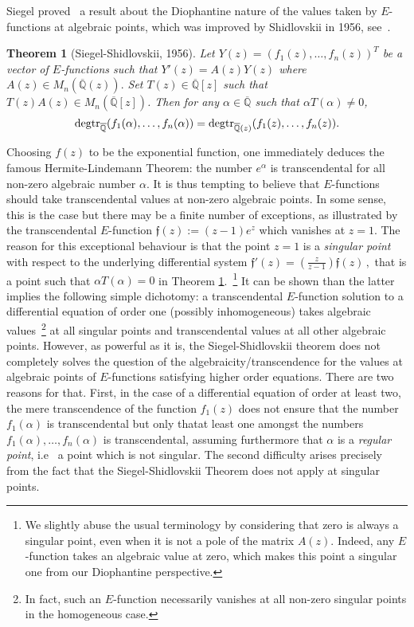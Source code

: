 \documentclass[reqno,english,12pt,a4paper]{smfart}
\newtheorem{thm}{Theorem}
\numberwithin{equation}{section}
\def\Qbar{\overline{\mathbb Q}}
\begin{document}
Siegel proved~\cite{Siegel} a result about the Diophantine nature of the values taken by $E$-functions at algebraic points, 
which was improved by Shidlovskii in 1956, see~\cite{shid}.

\begin{thm}[Siegel-Shidlovskii, 1956]\label{thmss}
Let $Y(z)=(f_1(z), \ldots, f_n(z))^T$ be a vector of $E$-functions such that 
$Y'(z)=A(z)Y(z)$ where $A(z)\in M_n(\Qbar(z)).$
Set $T(z)\in \Qbar[z]$ such that $T(z)A(z)\in M_n(\Qbar[z])$. 
Then for any $\alpha\in \Qbar$ such that $\alpha T(\alpha)\neq 0$, 
$$
\textup{degtr}_{\Qbar}(f_1(\alpha), \ldots, f_{n}(\alpha)) =\textup{degtr}_{\Qbar(z)}(f_1(z), \ldots, f_{n}(z)).
$$
\end{thm}


\medskip

Choosing $f(z)$ to be the exponential function, one  immediately deduces the famous Hermite-Lindemann Theorem:  
the number $e^{\alpha}$ is transcendental for all non-zero algebraic number $\alpha$. 
It is thus tempting to believe that $E$-functions should take transcendental values at non-zero algebraic points. In some sense, this is the case 
but there may be a finite number of exceptions, as illustrated by the transcendental $E$-function $\mathfrak f(z):=(z-1)e^z$ 
which vanishes at $z=1$. The reason for this exceptional behaviour is that the point $z=1$ is a \emph{singular point} with respect to the underlying 
differential system
$
\mathfrak f'(z)=(\frac{z}{z-1})\mathfrak f(z)\,,
$
that is a point such that $\alpha T(\alpha)=0$ in Theorem \ref{thmss}.~\footnote{We slightly abuse the usual terminology by considering 
that zero is always a singular point, even when it is not a pole of the matrix $A(z)$. Indeed,  
any $E$-function takes an algebraic value at zero, which makes this point a singular one from our Diophantine perspective.}  It can be shown than the latter implies 
the following simple dichotomy:  a transcendental  $E$-function solution to a differential equation 
of order one (possibly inhomogeneous) takes algebraic values~\footnote{In fact, such an $E$-function necessarily vanishes at all non-zero singular points in the homogeneous case.} 
at all singular points and transcendental values at all other algebraic points. 
However, as powerful as it is, the Siegel-Shidlovskii theorem does not completely solves the question of the 
algebraicity/transcendence for the values at algebraic points of $E$-functions satisfying higher order equations.  
There are two reasons for that. First, in the case of a differential equation of order at least two,  
 the mere transcendence of the function $f_1(z)$ does not ensure that 
the number $f_1(\alpha)$ is transcendental but only thatat least  one amongst the 
 numbers $f_1(\alpha), \ldots, f_n(\alpha)$ is transcendental, assuming furthermore that $\alpha$ is a \emph{regular point}, i.e ~a point which is not singular. 
 The second difficulty arises precisely from the fact that the Siegel-Shidlovskii Theorem does not apply at  
 singular points. 
\end{document}
